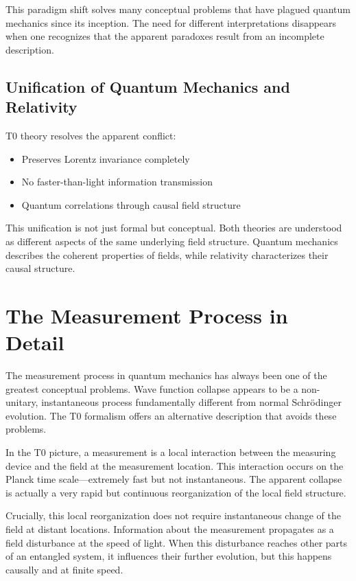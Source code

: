 \documentclass[12pt,a4paper]{article}
\begin{document}
	This paradigm shift solves many conceptual problems that have plagued quantum mechanics since its inception. The need for different interpretations disappears when one recognizes that the apparent paradoxes result from an incomplete description.
	
	\subsection{Unification of Quantum Mechanics and Relativity}
	
	T0 theory resolves the apparent conflict:
	\begin{itemize}
		\item Preserves Lorentz invariance completely
		\item No faster-than-light information transmission
		\item Quantum correlations through causal field structure
	\end{itemize}
	
	This unification is not just formal but conceptual. Both theories are understood as different aspects of the same underlying field structure. Quantum mechanics describes the coherent properties of fields, while relativity characterizes their causal structure.
	
	\section{The Measurement Process in Detail}
	
	The measurement process in quantum mechanics has always been one of the greatest conceptual problems. Wave function collapse appears to be a non-unitary, instantaneous process fundamentally different from normal Schrödinger evolution. The T0 formalism offers an alternative description that avoids these problems.
	
	In the T0 picture, a measurement is a local interaction between the measuring device and the field at the measurement location. This interaction occurs on the Planck time scale—extremely fast but not instantaneous. The apparent collapse is actually a very rapid but continuous reorganization of the local field structure.
	
	Crucially, this local reorganization does not require instantaneous change of the field at distant locations. Information about the measurement propagates as a field disturbance at the speed of light. When this disturbance reaches other parts of an entangled system, it influences their further evolution, but this happens causally and at finite speed.
	
\end{document}
